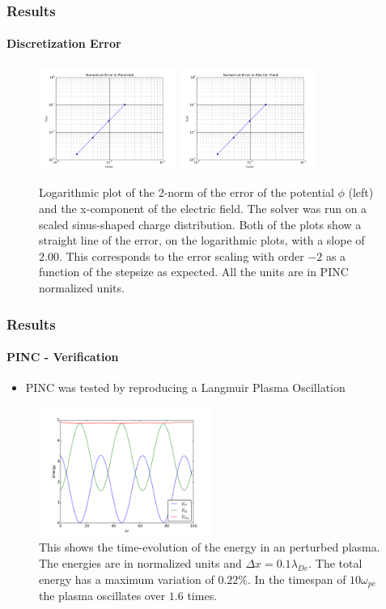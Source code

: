 \documentclass{beamer}
\begin{document}
\begin{frame}
	\frametitle{Results}
	\framesubtitle{Discretization Error}
	    \centering
	\begin{figure}
        \includegraphics[width = 0.4\textwidth]{figures/verification/errorloglogPotential}
		\includegraphics[width = 0.4\textwidth]{figures/verification/errorloglogE}
	    \caption{Logarithmic plot of the 2-norm of the error of the potential \(\phi\) (left) and the
	    x-component of the electric field. The solver was run on a scaled sinus-shaped charge distribution.
	    Both of the plots show a straight line of the error, on the logarithmic plots, with a slope
	    of \(2.00\). This corresponds to the error scaling with order \(-2\) as a function of the
		stepsize as expected. All the units are in PINC normalized units.}
	    \label{fig:errorScaling}
	\end{figure}
\end{frame}

\begin{frame}
	\frametitle{Results}
	\framesubtitle{PINC - Verification}
		\begin{itemize}
			\item PINC was tested by reproducing a Langmuir Plasma Oscillation
		\end{itemize}
		\begin{figure}
			\label{fig:oscillation}
			\includegraphics[width = 0.5\textwidth]{figures/verification/energyPlot}
			\caption{This shows the time-evolution of the energy in an perturbed plasma. The energies are
			in normalized units and \(\Delta x = 0.1 \lambda_{De}\). The total energy has a maximum variation of \(0.22\%\). In the timespan
			of \(10\omega_{pe}\) the plasma oscillates over \(1.6\) times.}
		\end{figure}
\end{frame}
\end{document}
